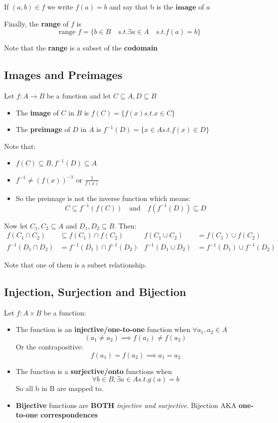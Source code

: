 \documentclass[letterpaper,12pt]{article}
\begin{document}
If $(a,b)\in f$ we write $f(a)=b$ and say that b is the $\textbf{image}$ of $a$

Finally, the \textbf{range} of $f$ is 
\[\text{range }f=\{b\in B\quad s.t.\exists a\in A \quad s.t. f(a)=b\}\]

Note that the \textbf{range} is a subset of the \textbf{codomain}

\subsection{Images and Preimages}
Let $f:A \to B$ be a function and let $C\subseteq A, D\subseteq B$
\begin{itemize}
    \item The \textbf{image} of $C$ in $B$ is $f(C)=\{f(x)s.t.x\in C\}$
    \item The \textbf{preimage} of $D$ in $A$ is $f^{-1}(D)=\{x\in A s.t. f(x)\in D\}$
\end{itemize}
Note that:
\begin{itemize}
    \item $f(C)\subseteq B, f^{-1}(D)\subseteq A$
    \item $f^{-1}\neq (f(x))^{-1}$ or $\frac{1}{f(x)}$
    \item So the preimage is not the inverse function which means:
    \[C\subseteq f^{-1}(f(C))\quad \text{and} \quad f(f^{-1}(D))\subseteq D\]
\end{itemize}

Now let $C_1, C_2\subseteq A$ and $D_1,D_2\subseteq B$. Then:
\begin{align*}
    f(C_1\cap C_2)&\subseteq f(C_1)\cap f(C_2) & f(C_1\cup C_2)&=f(C_1)\cup f(C_2)\\
    f^{-1}(D_1\cap D_2)& =f^{-1}(D_1)\cap f^{-1}(D_2) & f^{-1}(D_1\cup D_2)& =f^{-1}(D_1)\cup f^{-1}(D_2)
\end{align*}

Note that one of them is a subset relationship. 

\subsection{Injection, Surjection and Bijection}
Let $f:A\times B$ be a function:
\begin{itemize}
    \item The function is an \textbf{injective/one-to-one} function when $\forall a_1,a_2 \in A$
    \[(a_1\neq a_2)\implies f(a_1)\neq f(a_2) \]
    Or the contrapositive:
    \[f(a_1)=f(a_2)\implies a_1=a_2\]

    \item The function is a \textbf{surjective/onto} functions when \[\forall b\in B, \exists a\in A s.t.g(a)=b\] So all b in B are mapped to. 
    \item \textbf{Bijective} functions are \textbf{BOTH} \textit{injective and surjective}. Bijection AKA \textbf{one-to-one correspondences}
\end{itemize}
\end{document}

